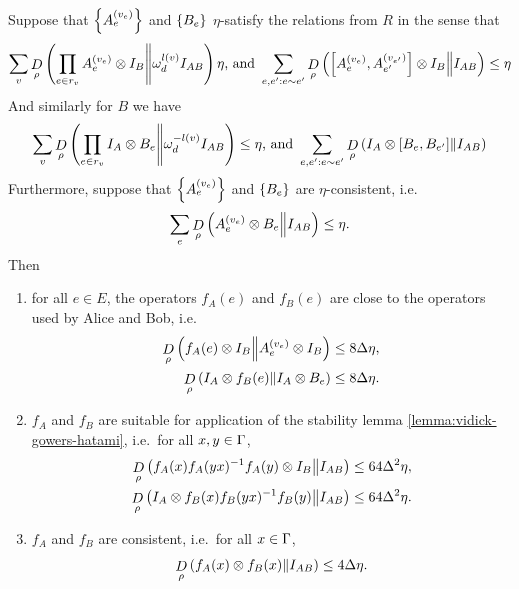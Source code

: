 \begin{lemma}\label{lemma:canonical-form-implies-stability}
	Suppose that $\left\{A_e^{(v_e)}\right\}$ and $\left\{B_e\right\}$ $\eta$-satisfy the relations from $R$ in the sense that
	\begin{equation}
	\label{lemma:canonical-form-implies-stability-1}
		\sum_v\mathop{D}\limits_{\rho}\left(\prod_{e\in r_v}A_e^{(v_e)}\otimes I_B\middle\| \omega_d^{l(v)} I_{AB}\right) \eta\text{, and }
		\sum_{e,e':e\sim e'} \mathop{D}\limits_{\rho}\left(\left[A_e^{(v_e)},A_{e'}^{(v_{e'})}\right]\otimes I_B\middle\| I_{AB}\right) \leq \eta
	\end{equation}
	And similarly for $B$ we have 
	\begin{equation}
	\label{lemma:canonical-form-implies-stability-1-B}
	\sum_v \mathop{D}\limits_{\rho}\left(
		\prod_{e\in r_v} I_A\otimes B_e\middle\| \omega_d^{-l(v)}I_{AB}\right) \leq \eta\text{, and }
		\sum_{e,e':e\sim e'} \mathop{D}\limits_{\rho}\left(I_A\otimes [B_e,B_{e'}]\middle\| I_{AB}\right)
	\end{equation}
	 Furthermore, suppose that $\left\{A_e^{(v_e)}\right\}$ and $\left\{B_e\right\}$ are $\eta$-consistent, i.e.\ 
	 \begin{equation}
	 \label{lemma:canonical-form-implies-stability-2}
	 	\sum_e \mathop{D}\limits_{\rho}\left(A_e^{(v_e)}\otimes B_e\middle\| I_{AB}\right) \leq \eta.
	 \end{equation}
	  Then 
	  \begin{enumerate}[(1)]
	  	\item 
	  for all $e\in E$, the operators $f_A(e)$ and $f_B(e)$ are close to the operators used by Alice and Bob, i.e.\ 
	  \begin{align}
	  \label{eq:canonical-form-implies-stability-conclusion-1}
	  	\mathop{D}\limits_{\rho}\left(f_A(e)\otimes I_B\middle\|  A_e^{(v_e)}\otimes I_B \right) &\leq 8\Delta \eta,
	  	\\
	  	\mathop{D}\limits_{\rho}\left(I_A \otimes f_B(e)\middle\|  I_A \otimes B_e\right) &\leq 8\Delta\eta. 
	  \end{align}
	\item \label{item:canonical-form-implies-stability}$f_A$ and $f_B$ are suitable for application of the stability lemma \ref{lemma:vidick-gowers-hatami}, i.e.\ for all $x,y\in \Gamma$, 
	\begin{align}
	\label{eq:canonical-form-implies-stability}
		\mathop{D}\limits_{\rho}\left(f_A(x)f_A(yx)^{-1}f_A(y)\otimes I_B\middle\| I_{AB}\right) &\leq 64\Delta^2\eta,
		\\
		\mathop{D}\limits_{\rho}\left(I_A\otimes f_B(x)f_B(yx)^{-1}f_B(y)\middle\| I_{AB}\right)&\leq 64\Delta^2\eta.
	\end{align}
	\item \label{item:canonical-form-implies-consistency}$f_A$ and $f_B$ are consistent, i.e.\  for all $x\in \Gamma$,
	\begin{equation}
	\label{eq:canonical-form-implies-consistency}
		\mathop{D}\limits_{\rho}\left(f_A(x)\otimes f_B(x)\middle\| I_{AB}\right) \leq 4\Delta\eta.
	\end{equation}
  \end{enumerate}

\end{lemma}
